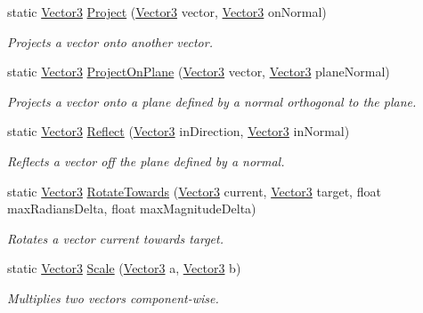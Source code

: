 \begin{DoxyCompactItemize}
static \mbox{\hyperlink{class_lua_1_1_vector3}{Vector3}} \mbox{\hyperlink{class_lua_1_1_vector3_aa9b7aad25b72d46c5e49e847bbc41353}{Project}} (\mbox{\hyperlink{class_lua_1_1_vector3}{Vector3}} vector, \mbox{\hyperlink{class_lua_1_1_vector3}{Vector3}} on\+Normal)
\begin{DoxyCompactList}\small\item\em Projects a vector onto another vector. \end{DoxyCompactList}\item 
static \mbox{\hyperlink{class_lua_1_1_vector3}{Vector3}} \mbox{\hyperlink{class_lua_1_1_vector3_af4bc2b40c64c31d8ade94277052e46d1}{Project\+On\+Plane}} (\mbox{\hyperlink{class_lua_1_1_vector3}{Vector3}} vector, \mbox{\hyperlink{class_lua_1_1_vector3}{Vector3}} plane\+Normal)
\begin{DoxyCompactList}\small\item\em Projects a vector onto a plane defined by a normal orthogonal to the plane. \end{DoxyCompactList}\item 
static \mbox{\hyperlink{class_lua_1_1_vector3}{Vector3}} \mbox{\hyperlink{class_lua_1_1_vector3_a6973141d227d4b18eb09caaa3cb965b4}{Reflect}} (\mbox{\hyperlink{class_lua_1_1_vector3}{Vector3}} in\+Direction, \mbox{\hyperlink{class_lua_1_1_vector3}{Vector3}} in\+Normal)
\begin{DoxyCompactList}\small\item\em Reflects a vector off the plane defined by a normal. \end{DoxyCompactList}\item 
static \mbox{\hyperlink{class_lua_1_1_vector3}{Vector3}} \mbox{\hyperlink{class_lua_1_1_vector3_a938bc42ace148202da5445f245581927}{Rotate\+Towards}} (\mbox{\hyperlink{class_lua_1_1_vector3}{Vector3}} current, \mbox{\hyperlink{class_lua_1_1_vector3}{Vector3}} target, float max\+Radians\+Delta, float max\+Magnitude\+Delta)
\begin{DoxyCompactList}\small\item\em Rotates a vector current towards target. \end{DoxyCompactList}\item 
static \mbox{\hyperlink{class_lua_1_1_vector3}{Vector3}} \mbox{\hyperlink{class_lua_1_1_vector3_a1b7601ca79dfd9b6f3ab3636508c197a}{Scale}} (\mbox{\hyperlink{class_lua_1_1_vector3}{Vector3}} a, \mbox{\hyperlink{class_lua_1_1_vector3}{Vector3}} b)
\begin{DoxyCompactList}\small\item\em Multiplies two vectors component-\/wise. \end{DoxyCompactList}\item 

\end{DoxyCompactItemize}
